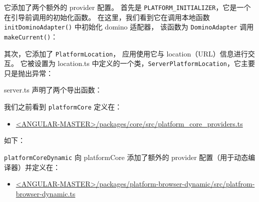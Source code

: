 它添加了两个额外的 provider 配置。
首先是 \texttt{PLATFORM\_INITIALIZER}，它是一个在引导前调用的初始化函数。
在这里，我们看到它在调用本地函数 \texttt{initDominoAdapter()} 中初始化 domino 适配器，
该函数为 \texttt{DominoAdapter} 调用 \texttt{makeCurrent()}：




其次，它添加了 \texttt{PlatformLocation}，
应用使用它与 location（URL）信息进行交互。
它被设置为 location.ts 中定义的一个类，\texttt{ServerPlatformLocation}，它主要只是抛出异常：




server.ts 声明了两个导出函数：




我们之前看到 \texttt{platformCore} 定义在：

\begin{itemize}
  \item \href{https://github.com/angular/angular/blob/master/packages/core/src/platform_core_providers.ts}
        {<ANGULAR-MASTER>/packages/core/src/platform\_core\_providers.ts}
\end{itemize}


如下：




\texttt{platformCoreDynamic} 向 platformCore 添加了额外的 provider 配置（用于动态编译器）并定义在：

\begin{itemize}
  \item \href{https://github.com/angular/angular/blob/master/packages/platform-browser-dynamic/src/platform_core_dynamic.ts}
        {<ANGULAR-MASTER>/packages/platform-browser-dynamic/src/platfrom-browser-dynamic.ts}
\end{itemize}

